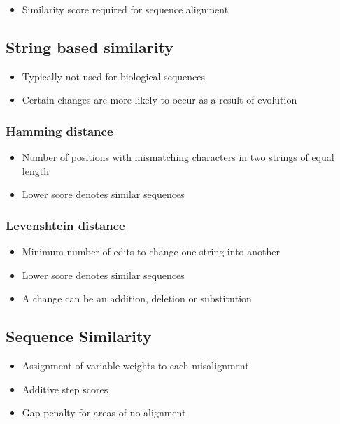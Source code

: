\documentclass[a4paper]{article}
\begin{document}
\begin{itemize}
  \item Similarity score required for sequence alignment
\end{itemize}

\subsection{String based similarity}

\begin{itemize}
  \item Typically not used for biological sequences
  \item Certain changes are more likely to occur as a result of evolution
\end{itemize}

\subsubsection{Hamming distance}

\begin{itemize}
  \item Number of positions with mismatching characters in two strings of equal
        length
  \item Lower score denotes similar sequences
\end{itemize}

\subsubsection{Levenshtein distance}

\begin{itemize}
  \item Minimum number of edits to change one string into another
  \item Lower score denotes similar sequences
  \item A change can be an addition, deletion or substitution
\end{itemize}

\subsection{Sequence Similarity}

\begin{itemize}
  \item Assignment of variable weights to each misalignment
  \item Additive step scores
  \item Gap penalty for areas of no alignment
\end{itemize}
\end{document}
